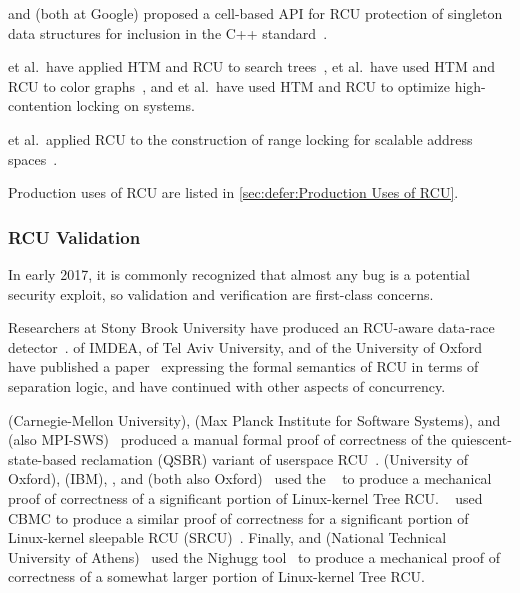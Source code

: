  and  (both at Google) proposed
a cell-based API for RCU
protection of singleton data structures for inclusion in the
C++ standard~\cite{GeoffRomer2018C++DeferredReclamationP0561R4}.

 et al.~have applied
HTM and RCU to search trees~\cite{Siakavaras2017CombiningHA,DimitriosSiakavaras2020RCU-HTM-B+Trees},
 et al.~have used HTM and RCU to color
graphs~\cite{ChristinaGiannoula2018HTM-RCU-graphcoloring},
and
 et al.~have used HTM and RCU to optimize high-contention
locking on  systems.

 et al.~applied RCU to the construction of range locking
for scalable address spaces~\cite{AlexKogan2020RCUrangelocks}.

Production uses of RCU are listed in
\cref{sec:defer:Production Uses of RCU}.

\subsubsection{RCU Validation}
\label{sec:defer:RCU Validation}

In early 2017, it is commonly recognized that almost any bug is a potential
security exploit, so validation and verification are first-class concerns.

Researchers at Stony Brook University have produced an RCU-aware data-race
detector~\cite{AbhinavDuggal2010Masters,JustinSeyster2012PhD,Seyster:2011:RFA:2075416.2075425}.
 of IMDEA,  of Tel Aviv University,
and  of the University of Oxford have published a
paper~\cite{AlexeyGotsman2012VerifyGraceExtended} expressing the formal
semantics of RCU in terms of separation logic, and have continued with
other aspects of concurrency.

 (Carnegie-Mellon University),  (Max
Planck Institute for Software Systems), and 
(also MPI-SWS)~\cite{JosephTassarotti2015RCUproof}
produced a manual formal proof of correctness of the quiescent-state-based
reclamation (QSBR) variant of userspace
RCU~\cite{MathieuDesnoyers2009URCU,MathieuDesnoyers2012URCU}.
 (University of Oxford),  (IBM),
, and 
(both also Oxford)~\cite{LihaoLiang2016VerifyTreeRCU}
used the ~\cite{EdmundClarke2004CBMC}
to produce a mechanical proof of correctness of a significant portion
of Linux-kernel Tree RCU\@.
~\cite{LanceRoy2017CBMC-SRCU} used CBMC to produce a similar
proof of correctness for a significant portion of Linux-kernel
sleepable RCU (SRCU)~\cite{PaulEMcKenney2006c}.
Finally,  and 
(National Technical University of
Athens)~\cite{MichalisKokologiannakis2017NidhuggRCU,MichalisKokologiannakis2019RCUstatelessModelCheck}
used the Nighugg tool~\cite{CarlLeonardsson2014Nidhugg}
to produce a mechanical proof of correctness of a somewhat larger
portion of Linux-kernel Tree RCU\@.

